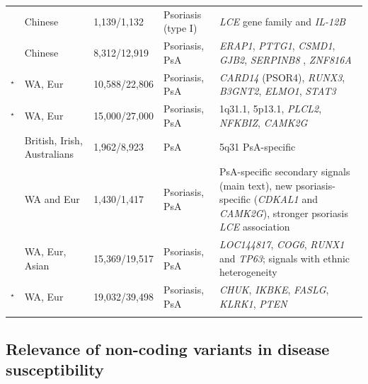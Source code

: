 \begin{landscape}
\begin{center}
\begin{longtable}[ht]{p{.25\textheight} p{.25\textheight} p{.20\textheight} p{.20\textheight} p{.50\textheight}}
\parencite{Zhang2008} & Chinese	& 1,139/1,132	& Psoriasis (type I)  & \textit{LCE} gene family and \textit{IL-12B} \\

\parencite{Sun2010} & Chinese	& 8,312/12,919	& Psoriasis, PsA &	\textit{ERAP1}, \textit{PTTG1}, \textit{CSMD1}, \textit{GJB2}, \textit{SERPINB8} , \textit{ZNF816A} \\

\parencite{Tsoi2012}$^\star$ & WA, Eur & 10,588/22,806 & Psoriasis, PsA & \textit{CARD14} (PSOR4), \textit{RUNX3}, \textit{B3GNT2}, \textit{ELMO1}, \textit{STAT3} \\

\parencite{Tsoi2015a}$^\star$	& WA, Eur	& 15,000/27,000	& Psoriasis, PsA	& 1q31.1, 5p13.1, \textit{PLCL2}, \textit{NFKBIZ}, \textit{CAMK2G} \\

\parencite{Bowes2015} &	British, Irish, Australians	& 1,962/8,923	& PsA	& 5q31 PsA-specific \\

\parencite{Stuart2015} &	WA and Eur	& 1,430/1,417	& Psoriasis, PsA	& PsA-specific secondary signals (main text), new psoriasis-specific (\textit{CDKAL1} and \textit{CAMK2G}), stronger psoriasis \textit{LCE} association\\

\parencite{Yin2015} &	WA, Eur, Asian	&  15,369/19,517 & Psoriasis, PsA	& \textit{LOC144817}, \textit{COG6}, \textit{RUNX1} and \textit{TP63}; signals with ethnic heterogeneity \\

\parencite{Tsoi2017}$^\star$ &	WA, Eur	& 19,032/39,498	& Psoriasis, PsA	& \textit{CHUK}, \textit{IKBKE}, \textit{FASLG}, \textit{KLRK1}, \textit{PTEN} \\																		
\bottomrule
\medskip
\end{longtable}
\end{center}
\end{landscape}



\subsection{Relevance of non-coding variants in disease susceptibility}

